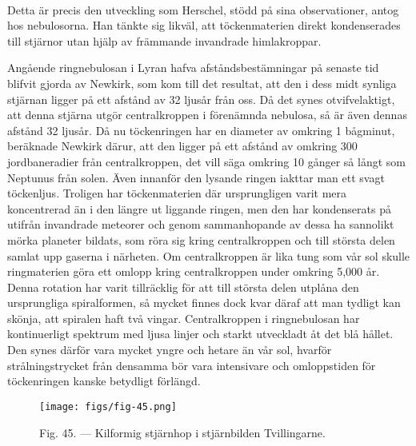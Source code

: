 \documentclass[a4paper, 12pt, oneside, swedish]{article}
\begin{document}
\paragraph{}
Detta är precis den utveckling som Herschel, stödd på sina observationer, antog hos nebulosorna. Han tänkte sig likväl, att töckenmaterien direkt kondenserades till stjärnor utan hjälp av främmande invandrade himlakroppar.

Angående ringnebulosan i Lyran hafva afståndsbestämningar på senaste tid blifvit gjorda av Newkirk, som kom till det resultat, att den i dess midt synliga stjärnan ligger på ett afstånd av 32 ljusår från oss. Då det synes otvifvelaktigt, att denna stjärna utgör centralkroppen i förenämnda nebulosa, så är även dennas afstånd 32 ljusår. Då nu töckenringen har en diameter av omkring 1 bågminut, beräknade Newkirk därur, att den ligger på ett afstånd av omkring 300 jordbaneradier från centralkroppen, det vill säga omkring 10 gånger så långt som Neptunus från solen. Även innanför den lysande ringen iakttar man ett svagt töckenljus. Troligen har töckenmaterien där ursprungligen varit mera koncentrerad än i den längre ut liggande ringen, men den har kondenserats på utifrån invandrade meteorer och genom sammanhopande av dessa ha sannolikt mörka planeter bildats, som röra sig kring centralkroppen och till största delen samlat upp gaserna i närheten. Om centralkroppen är lika tung som vår sol skulle ringmaterien göra ett omlopp kring centralkroppen under omkring 5,000 år. Denna rotation har varit tillräcklig för att till största delen utplåna den ursprungliga spiralformen, så mycket finnes dock kvar däraf att man tydligt kan skönja, att spiralen haft två vingar. Centralkroppen i ringnebulosan har kontinuerligt spektrum med ljusa linjer och starkt utveckladt åt det blå hållet. Den synes därför vara mycket yngre och hetare än vår sol, hvarför strålningstrycket från densamma bör vara intensivare och omloppstiden för töckenringen kanske betydligt förlängd.

\begin{figure}[H]
\centering
\texttt{[image: figs/fig-45.png]}
\caption{Fig. 45. --- Kilformig stjärnhop i stjärnbilden Tvillingarne.}
\end{figure}
\end{document}

